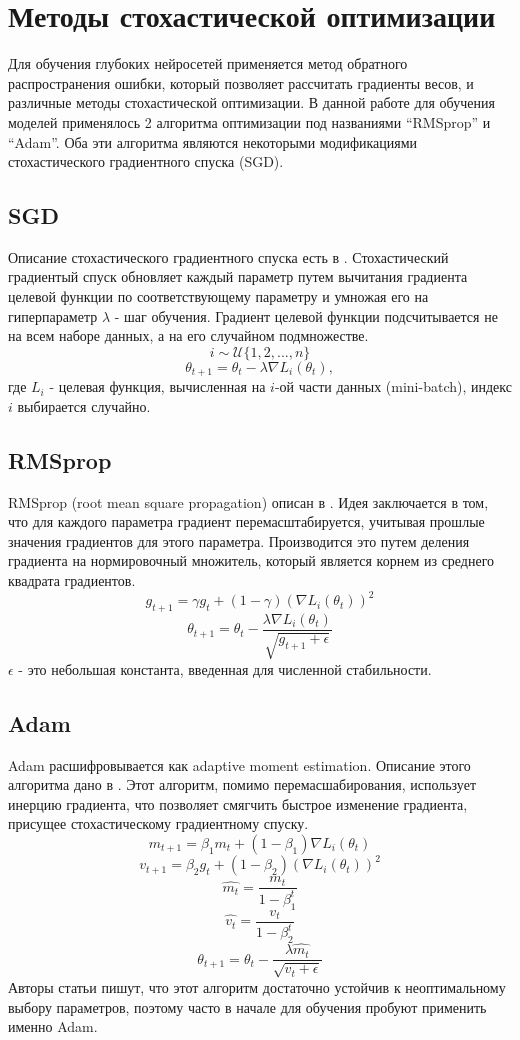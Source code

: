 \clearpage
\section{Методы стохастической оптимизации}
	Для обучения глубоких нейросетей применяется метод обратного распространения ошибки, который позволяет рассчитать градиенты весов, и различные методы стохастической оптимизации. В данной работе для обучения моделей применялось 2 алгоритма оптимизации под названиями ``RMSprop'' и ``Adam''. Оба эти алгоритма являются некоторыми модификациями стохастического градиентного спуска (SGD).
	\subsection{SGD}
		Описание стохастического градиентного спуска есть в \cite{sgd}. Стохастический градиентый спуск обновляет каждый параметр путем вычитания градиента целевой функции по соответствующему параметру и умножая его на гиперпараметр $\lambda$ - шаг обучения. Градиент целевой функции подсчитывается не на всем наборе данных, а на его случайном подмножестве.
		$$ i \sim \mathcal{U}\{1, 2, ..., n\} $$
		$$ \theta_{t+1} = \theta_t - \lambda \nabla L_i(\theta_t), $$
		где $L_i$ - целевая функция, вычисленная на $i$-ой части данных (mini-batch), индекс $i$ выбирается случайно.
	\subsection{RMSprop}
		RMSprop (root mean square propagation) описан в \cite{rmsprop}. Идея заключается в том, что для каждого параметра градиент перемасштабируется, учитывая прошлые значения градиентов для этого параметра. Производится это путем деления градиента на нормировочный множитель, который является корнем из среднего квадрата градиентов.
		$$ g_{t+1} = \gamma g_t + (1 - \gamma) (\nabla L_i(\theta_t))^2$$
		$$ \theta_{t+1} = \theta_t - \frac{\lambda \nabla L_i(\theta_t)}{\sqrt{g_{t+1} + \epsilon}} $$
		$\epsilon$ - это небольшая константа, введенная для численной стабильности.
	\subsection{Adam}
		Adam расшифровывается как adaptive moment estimation. Описание этого алгоритма дано в \cite{adam}. Этот алгоритм, помимо перемасшабирования, использует инерцию градиента, что позволяет смягчить быстрое изменение градиента, присущее стохастическому градиентному спуску.
		$$ m_{t+1} = \beta_1 m_t + (1 - \beta_1) \nabla L_i(\theta_t) $$
		$$ v_{t+1} = \beta_2 g_t + (1 - \beta_2) (\nabla L_i(\theta_t))^2 $$
		$$ \hat{m_t} = \frac{m_t}{1 - \beta_1^t} $$
		$$ \hat{v_t} = \frac{v_t}{1 - \beta_2^t}$$
		$$ \theta_{t+1} = \theta_t - \frac{\lambda \hat{m_t}}{\sqrt{v_t + \epsilon}} $$
		Авторы статьи \cite{adam} пишут, что этот алгоритм достаточно устойчив к неоптимальному выбору параметров, поэтому часто в начале для обучения пробуют применить именно Adam.